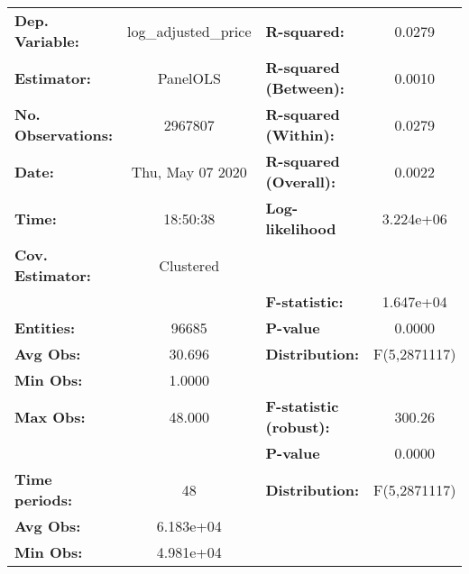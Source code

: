 \documentclass{report}
\begin{document}
\begin{center}
\begin{tabular}{lclc}
\toprule
\textbf{Dep. Variable:}                          & log\_adjusted\_price & \textbf{  R-squared:         }   &      0.0279      \\
\textbf{Estimator:}                              &       PanelOLS       & \textbf{  R-squared (Between):}  &      0.0010      \\
\textbf{No. Observations:}                       &       2967807        & \textbf{  R-squared (Within):}   &      0.0279      \\
\textbf{Date:}                                   &   Thu, May 07 2020   & \textbf{  R-squared (Overall):}  &      0.0022      \\
\textbf{Time:}                                   &       18:50:38       & \textbf{  Log-likelihood     }   &    3.224e+06     \\
\textbf{Cov. Estimator:}                         &      Clustered       & \textbf{                     }   &                  \\
\textbf{}                                        &                      & \textbf{  F-statistic:       }   &    1.647e+04     \\
\textbf{Entities:}                               &        96685         & \textbf{  P-value            }   &      0.0000      \\
\textbf{Avg Obs:}                                &        30.696        & \textbf{  Distribution:      }   &   F(5,2871117)   \\
\textbf{Min Obs:}                                &        1.0000        & \textbf{                     }   &                  \\
\textbf{Max Obs:}                                &        48.000        & \textbf{  F-statistic (robust):} &      300.26      \\
\textbf{}                                        &                      & \textbf{  P-value            }   &      0.0000      \\
\textbf{Time periods:}                           &          48          & \textbf{  Distribution:      }   &   F(5,2871117)   \\
\textbf{Avg Obs:}                                &      6.183e+04       & \textbf{                     }   &                  \\
\textbf{Min Obs:}                                &      4.981e+04       & \textbf{                     }   &                  \\

\end{tabular}
\end{center}
\end{document}
